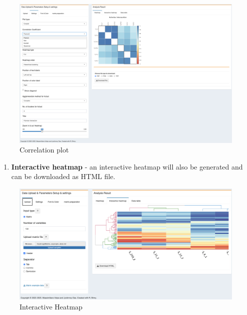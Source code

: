 \documentclass[
  a4paper,
  oneside,
  open=any]{scrreport}
\providecommand{\tightlist}{%
  \setlength{\itemsep}{0pt}\setlength{\parskip}{0pt}}\usepackage{longtable,booktabs,array}
\begin{document}
\begin{figure}[H]

{\centering \includegraphics{./_images/correlationplot-setting.png}

}

\caption{Correlation plot}

\end{figure}

\begin{enumerate}
\def\labelenumi{\arabic{enumi}.}
\setcounter{enumi}{1}
\tightlist
\item
  \textbf{Interactive heatmap} - an interactive heatmap will also be
  generated and can be downloaded as HTML file.\\
\end{enumerate}

\begin{figure}[H]

{\centering \includegraphics{./_images/heatmap2.png}

}

\caption{Interactive Heatmap}

\end{figure}
\end{document}
